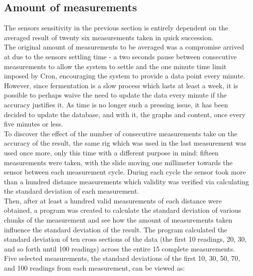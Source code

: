 \documentclass[twoside]{ctuthesis}
\theoremstyle{plain}
\theoremstyle{definition}
\theoremstyle{note}
\begin{document}
\subsection{Amount of measurements}
The sensors sensitivity in the previous section is entirely dependent on the averaged result of twenty six measurements taken in quick succession.\\
The original amount of measurements to be averaged was a compromise arrived at due to the sensors settling time - a two seconds pause between consecutive measurements to allow the system to settle and the one minute time limit imposed by Cron, encouraging the system to provide a data point every minute. However, since fermentation is a slow process which lasts at least a week\cite{Joy_Of_Brewing}, it is possible to perhaps waive the need to update the data every minute if the accuracy justifies it. As time is no longer such a pressing issue, it has been decided to update the database, and with it, the graphs and content, once every five minutes or less.\\
To discover the effect of the number of consecutive measurements take on the accuracy of the result, the same rig which was used in the last measurement was used once more, only this time with a different purpose in mind: fifteen measurements were taken, with the slide moving one millimeter towards the sensor between each measurement cycle. During each cycle the sensor took more than a hundred distance measurements which validity was verified via calculating the standard deviation of each measurement.\\
Then, after at least a hundred valid measurements of each distance were obtained, a program was created to calculate the standard deviation of various chunks of the measurement and see how the amount of measurements taken influence the standard deviation of the result. The program calculated the standard deviation of ten cross sections of the data (the first 10 readings, 20, 30, and so forth until 100 readings) across the entire 15 complete measurements.\\
Five selected measurements, the standard deviations of the first 10, 30, 50, 70, and 100 readings from each measurement, can be viewed as:
 
\end{document}
